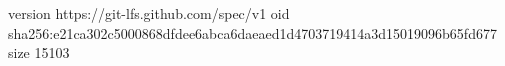 version https://git-lfs.github.com/spec/v1
oid sha256:e21ca302c5000868dfdee6abca6daeaed1d4703719414a3d15019096b65fd677
size 15103

